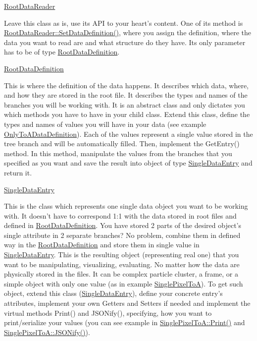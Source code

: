 \begin{DoxyItemize}
\item \hyperlink{classRootDataReader}{Root\+Data\+Reader}

Leave this class as is, use its A\+P\+I to your heart's content. One of its method is \hyperlink{classRootDataReader_ad670745df69f90ea6578d7c29cab716f}{Root\+Data\+Reader\+::\+Set\+Data\+Definition()}, where you assign the definition, where the data you want to read are and what structure do they have. Its only parameter has to be of type \hyperlink{classRootDataDefinition}{Root\+Data\+Definition}.
\item \hyperlink{classRootDataDefinition}{Root\+Data\+Definition}

This is where the definition of the data happens. It describes which data, where, and how they are stored in the root file. It describes the types and names of the branches you will be working with. It is an abstract class and only dictates you which methods you have to have in your child class. Extend this class, define the types and names of values you will have in your data (see example \hyperlink{classOnlyToADataDefinition}{Only\+To\+A\+Data\+Definition}). Each of the values represent a single value stored in the tree branch and will be automatically filled. Then, implement the Get\+Entry() method. In this method, manipulate the values from the branches that you specified as you want and save the result into object of type \hyperlink{classSingleDataEntry}{Single\+Data\+Entry} and return it.
\item \hyperlink{classSingleDataEntry}{Single\+Data\+Entry}

This is the class which represents one single data object you want to be working with. It doesn't have to correspond 1\+:1 with the data stored in root files and defined in \hyperlink{classRootDataDefinition}{Root\+Data\+Definition}. You have stored 2 parts of the desired object's single attribute in 2 separate branches? No problem, combine them in defined way in the \hyperlink{classRootDataDefinition}{Root\+Data\+Definition} and store them in single value in \hyperlink{classSingleDataEntry}{Single\+Data\+Entry}. This is the resulting object (representing real one) that you want to be manipulating, visualizing, evaluating. No matter how the data are physically stored in the files. It can be complex particle cluster, a frame, or a simple object with only one value (as in example \hyperlink{classSinglePixelToA}{Single\+Pixel\+To\+A}). To get such object, extend this class (\hyperlink{classSingleDataEntry}{Single\+Data\+Entry}), define your concrete entry's attributes, implement your own Getters and Setters if needed and implement the virtual methods Print() and J\+S\+O\+Nify(), specifying, how you want to print/serialize your values (you can see example in \hyperlink{classSinglePixelToA_a8b9d4ef4082473c747157b9b2c1376b0}{Single\+Pixel\+To\+A\+::\+Print()} and \hyperlink{classSingleDataEntry_a9e48725016d6fbd6bd674d5b299dbb12}{Single\+Pixel\+To\+A\+::\+J\+S\+O\+Nify()}).


\end{DoxyItemize}
